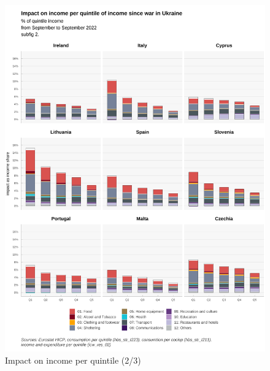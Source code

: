 \documentclass[
  9pt,
  a4paper,
  numbers=noendperiod,
  DIV=12]{scrartcl}
\begin{document}
\begin{figure}

\caption{Impact on income per quintile (2/3)}

{\centering \includegraphics{svg/coicop_l1_1y_2.png}

}

\end{figure}
\end{document}
